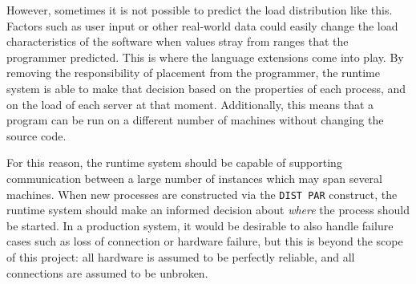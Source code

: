 However, sometimes it is not possible to predict the load distribution like
this. Factors such as user input or other real-world data could easily change
the load characteristics of the software when values stray from ranges that the
programmer predicted. This is where the language extensions come into play. By
removing the responsibility of placement from the programmer, the runtime system
is able to make that decision based on the properties of each process, and on
the load of each server at that moment. Additionally, this means that a program
can be run on a different number of machines without changing the source code.

For this reason, the runtime system should be capable of supporting
communication between a large number of instances which may span several
machines. When new processes are constructed via the \texttt{DIST PAR}
construct, the runtime system should make an informed decision about
\textit{where} the process should be started. In a production system, it would
be desirable to also handle failure cases such as loss of connection or hardware
failure, but this is beyond the scope of this project: all hardware is assumed
to be perfectly reliable, and all connections are assumed to be unbroken.
